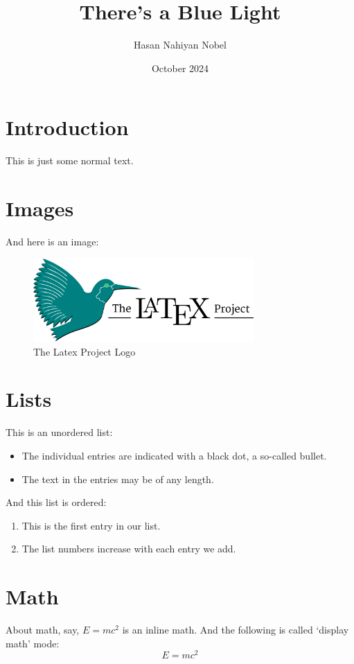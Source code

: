 \documentclass[11pt, a4paper]{article}
\title{There's a Blue Light}
\author{Hasan Nahiyan Nobel}
\date{October 2024}
\begin{document}
    \maketitle
    \tableofcontents


    \section{Introduction}\label{sec:introduction}
    This is just some normal text.


    \section{Images}\label{sec:images}
    And here is an image:
    \begin{figure}[h]
        \centering
        \includegraphics[width=0.75\textwidth]{latex_project_logo}
        \caption{The Latex Project Logo}
        \label{fig:latex_project_logo}
    \end{figure}


    \section{Lists}\label{sec:lists}
    This is an unordered list:
    \begin{itemize}
        \item The individual entries are indicated with a black dot, a so-called bullet.
        \item The text in the entries may be of any length.
    \end{itemize}
    And this list is ordered:
    \begin{enumerate}
        \item This is the first entry in our list.
        \item The list numbers increase with each entry we add.
    \end{enumerate}


    \section{Math}\label{sec:math}
    About math, say, $E = mc^2$ is an inline math.
    And the following is called ‘display math’ mode:
    \begin{equation}
        E=mc^2
        \label{eq:equation_1}
    \end{equation}
\end{document}

